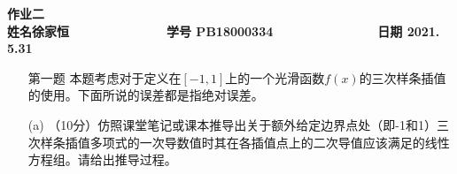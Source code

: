\documentclass[12pt,a4paper,UTF8]{ctexart}
\begin{document}


\begin{center}
\textbf{作业二}\\
\textbf{姓名\quad 徐家恒~~~~~~~~~~~~~ 学号 PB18000334~~~~~~~~~~~~~~ 日期 2021.	5.31}\\
\end{center}

\begin{center}
\fbox{
\begin{minipage}{40em}
\vspace{5cm}
\hspace{20cm}
\end{minipage}}
\end{center}
\vspace{1cm}

\begin{enumerate}
	\item[第一题]
	本题考虑对于定义在$[-1, 1]$上的一个光滑函数$f(x)$的三次样条插值的使用。下面所说的误差都是指绝对误差。

	(a) （10分）仿照课堂笔记或课本推导出关于额外给定边界点处（即-1和1）三次样条插值多项式的一次导数值时其在各插值点上的二次导值应该满足的线性方程组。请给出推导过程。\\


\end{enumerate}
\end{document}
